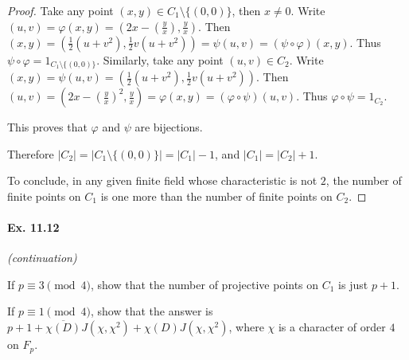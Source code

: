 \documentclass[11pt,a4paper]{article}
\begin{document}
\begin{proof}
Take any point $(x,y) \in C_1 \setminus \{(0,0)\} $, then $x \ne 0$. Write $(u,v) = \varphi(x,y) = \left(2x - \left(\frac{y}{x} \right), \frac{y}{x}\right)$. Then $(x,y) = \left(\frac{1}{2}(u+v^2), \frac{1}{2} v (u+v^2)\right)= \psi(u,v) = (\psi \circ \varphi)(x,y)$. Thus $\psi \circ \varphi = 1_{C_1 \setminus \{(0,0)\}}$.
Similarly, take any point $(u,v) \in C_2$. Write $(x,y) = \psi(u,v) = \left(\frac{1}{2}(u+v^2), \frac{1}{2} v (u+v^2)\right)$. Then $(u,v) = \left(2x - \left(\frac{y}{x} \right)^2, \frac{y}{x}\right) = \varphi(x,y) = (\varphi \circ \psi)(u,v)$. Thus $\varphi \circ \psi = 1_{C_2}$.

This proves that $\varphi$ and $\psi$ are bijections.

Therefore $|C_2| = |C_1 \setminus \{(0,0)\}| = |C_1| - 1$, and $|C_1| = |C_2| +1$. 

To conclude, in any given finite field whose characteristic is not $2$, the number of finite points on $C_1$ is one more than the number of finite points on $C_2$.
\end{proof}

\paragraph{Ex. 11.12}{\it (continuation) 

 If $p\equiv 3 \pmod 4$, show that the number of projective points on $C_1$ is just $p+1$.

 If $p\equiv 1 \pmod 4$, show that the answer is $p+1 + \overline{\chi(D)} J(\chi,\chi^2) + \chi(D) J(\chi,\chi^2)$, where $\chi$ is a character of order $4$ on $F_p$.
}

\medskip
\end{document}
